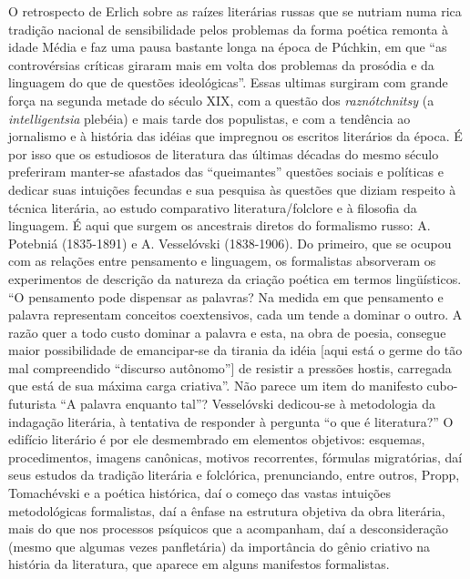 O retrospecto de Erlich sobre as raízes literárias russas que se nutriam
numa rica tradição nacional de sensibilidade pelos problemas da forma
poética remonta à idade Média e faz uma pausa bastante longa na época de
Púchkin, em que ``as controvérsias críticas giraram mais em volta dos
problemas da prosódia e da linguagem do que de questões ideológicas''.
Essas ultimas surgiram com grande força na segunda metade do século XIX,
com a questão dos \emph{raznótchnitsy} (a \emph{intelligentsia} plebéia)
e mais tarde dos populistas, e com a tendência ao jornalismo e à
história das idéias que impregnou os escritos literários da época. É por
isso que os estudiosos de literatura das últimas décadas do mesmo século
preferiram manter-se afastados das ``queimantes'' questões sociais e
políticas e dedicar suas intuições fecundas e sua pesquisa às questões
que diziam respeito à técnica literária, ao estudo comparativo
literatura/folclore e à filosofia da linguagem. É aqui que surgem os
ancestrais diretos do formalismo russo: A. Potebniá (1835-1891) e A.
Vesselóvski (1838-1906). Do primeiro, que se ocupou com as relações
entre pensamento e linguagem, os formalistas absorveram os experimentos
de descrição da natureza da criação poética em termos lingüísticos. ``O
pensamento pode dispensar as palavras? Na medida em que pensamento e
palavra representam conceitos coextensivos, cada um tende a dominar o
outro. A razão quer a todo custo dominar a palavra e esta, na obra de
poesia, consegue maior possibilidade de emancipar-se da tirania da idéia
{[}aqui está o germe do tão mal compreendido ``discurso autônomo''{]} de
resistir a pressões hostis, carregada que está de sua máxima carga
criativa''. Não parece um item do manifesto cubo-futurista ``A palavra
enquanto tal''? Vesselóvski dedicou-se à metodologia da indagação
literária, à tentativa de responder à pergunta ``o que é literatura?'' O
edifício literário é por ele desmembrado em elementos objetivos:
esquemas, procedimentos, imagens canônicas, motivos recorrentes,
fórmulas migratórias, daí seus estudos da tradição literária e
folclórica, prenunciando, entre outros, Propp, Tomachévski e a poética
histórica, daí o começo das vastas intuições metodológicas formalistas,
daí a ênfase na estrutura objetiva da obra literária, mais do que nos
processos psíquicos que a acompanham, daí a desconsideração (mesmo que
algumas vezes panfletária) da importância do gênio criativo na história
da literatura, que aparece em alguns manifestos formalistas.

